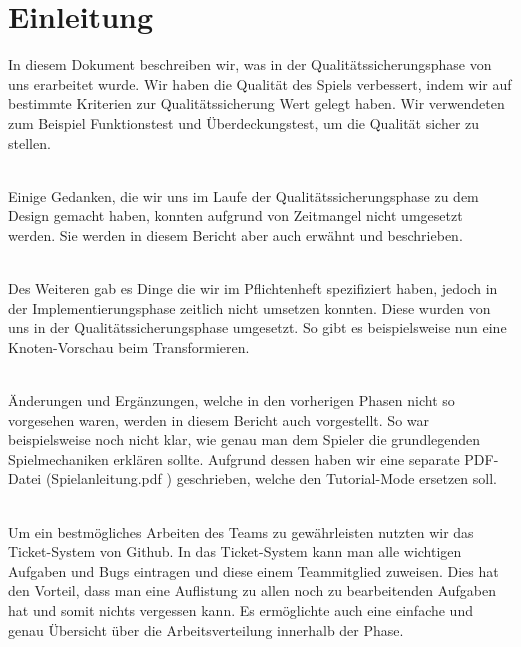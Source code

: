 %



\chapter{Einleitung}
\label{Kapitel:Einleitung}

In diesem Dokument beschreiben wir, was in der Qualitätssicherungsphase von uns erarbeitet wurde.
Wir haben die Qualität des Spiels verbessert, indem wir auf bestimmte Kriterien zur Qualitätssicherung Wert gelegt haben. Wir verwendeten zum Beispiel Funktionstest und Überdeckungstest, um die Qualität sicher zu stellen.\\~

Einige Gedanken, die wir uns im Laufe der Qualitätssicherungsphase zu dem Design gemacht haben, konnten aufgrund von Zeitmangel nicht umgesetzt werden. Sie werden in diesem Bericht aber auch erwähnt und beschrieben.\\~

Des Weiteren gab es Dinge die wir im Pflichtenheft spezifiziert haben, jedoch in der Implementierungsphase zeitlich nicht umsetzen konnten. Diese wurden von uns in der Qualitätssicherungsphase umgesetzt. So gibt es beispielsweise nun eine Knoten-Vorschau beim Transformieren.\\~

Änderungen und Ergänzungen, welche in den vorherigen Phasen nicht so vorgesehen waren, werden in diesem Bericht auch vorgestellt. So war beispielsweise noch nicht klar, wie genau man dem Spieler die grundlegenden Spielmechaniken erklären sollte. Aufgrund dessen haben wir eine separate PDF-Datei (\glqq Spielanleitung.pdf \grqq) geschrieben, welche den Tutorial-Mode ersetzen soll.\\~

Um ein bestmögliches Arbeiten des Teams zu gewährleisten nutzten wir das Ticket-System von Github. In das Ticket-System kann man alle wichtigen Aufgaben und Bugs eintragen und diese einem Teammitglied zuweisen. Dies hat den Vorteil, dass man eine Auflistung zu allen noch zu bearbeitenden Aufgaben hat und somit nichts vergessen kann. Es ermöglichte auch eine einfache und genau Übersicht über die Arbeitsverteilung innerhalb der Phase.
 











